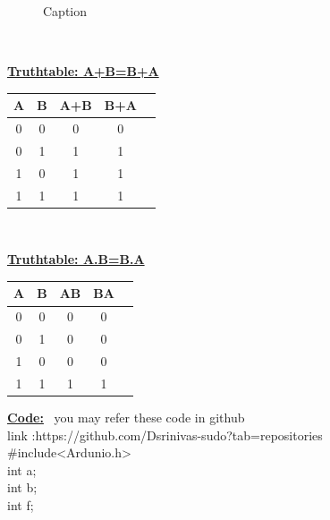 \documentclass[10pt,a4paper]{report}
\begin{document}
\begin{figure}

    \centering
    

    \caption{Caption}
    \label{fig:my_label}
\end{figure}
\vspace{5mm}


\vspace{7mm}
\\ \raggedright \textbf{\underline{Truthtable: A+B=B+A}}\vspace{2mm}
\begin{table}[ht]
\centering %
\begin{tabular}{c c c c c} %
\hline\hline %
 \textbf{A} & \textbf{B} & \textbf{A+B} &\textbf{B+A}\\ [0.5ex] %
\hline
      0 & 0 & 0 & 0\\
      0 & 1 & 1 & 1\\
      1 & 0 & 1 & 1\\
      1 & 1 & 1 & 1\\
\hline
\end{tabular}
\end{table}
\\ \raggedright \textbf{\underline{Truthtable: A.B=B.A}}\vspace{2mm}
\begin{table}[ht]
\centering %
\begin{tabular}{c c c c c} %
\hline\hline %
  \textbf{A} & \textbf{B} & \textbf{AB} &\textbf{BA}\\ [0.5ex] %
\hline
      0 & 0 & 0 & 0\\
      0 & 1 & 0 & 0\\
      1 & 0 & 0 & 0\\
      1 & 1 & 1 & 1\\
\hline
\end{tabular}
\end{table}
\raggedright \textbf{\underline{Code:}}\vspace{7mm}
\ you may  refer these code in github
\\ link    :https://github.com/Dsrinivas-sudo?tab=repositories
\\#include<Ardunio.h>
\\int a;
\\int b;
\\int f;
\end{document}
